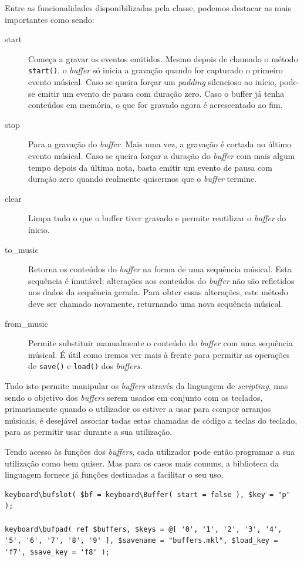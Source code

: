 Entre as funcionalidades disponibilizadas pela classe, podemos destacar as mais importantes como sendo:
\begin{description}
 \item[start] Começa a gravar os eventos emitidos. Mesmo depois de chamado o método \texttt{start()}, o \textit{buffer} só inicia a gravação quando for capturado o primeiro evento músical. Caso se queira forçar um \textit{padding} silencioso ao início, pode-se emitir um evento de pausa com duração zero. Caso o buffer já tenha conteúdos em memória, o que for gravado agora é acrescentado ao fim.
 \item[stop] Para a gravação do \textit{buffer}. Mais uma vez, a gravação é cortada no último evento músical. Caso se queira forçar a duração do \textit{buffer} com mais algum tempo depois da última nota, basta emitir um evento de pausa com duração zero quando realmente quisermos que o \textit{buffer} termine.
 \item[clear] Limpa tudo o que o buffer tiver gravado e permite reutilizar o \textit{buffer} do ínicio.
 \item[to\_music] Retorna os conteúdos do \textit{buffer} na forma de uma sequência músical. Esta sequência é ímutável: alterações aos conteúdos do \textit{buffer} não são refletidos nos dados da sequência gerada. Para obter essas alterações, este método deve ser chamado novamente, returnando uma nova sequência músical.
 \item[from\_music] Permite substituir manualmente o conteúdo do \textit{buffer} com uma sequência músical. É útil como iremos ver mais à frente para permitir as operações de \texttt{save()} e \texttt{load()} dos \textit{buffers}.
\end{description}

Tudo isto permite manipular os \textit{buffers} através da linguagem de \textit{scripting}, mas sendo o objetivo dos \textit{buffers} serem usados em conjunto com os teclados, primariamente quando o utilizador os estiver a usar para compor arranjos músicais, é desejável associar todas estas chamadas de código a teclas do teclado, para as permitir usar durante a sua utilização.

Tendo acesso às funções dos \textit{buffers}, cada utilizador pode então programar a sua utilização como bem quiser. Mas para os casos mais comuns, a biblioteca da linguagem fornece já funções destinadas a facilitar o seu uso.

\begin{lstlisting}[caption={Funções disponibilizadas para criação de \textit{buffers} controlados por teclados.}]
keyboard\bufslot( $bf = keyboard\Buffer( start = false ), $key = "p" );

keyboard\bufpad( ref $buffers, $keys = @[ '0', '1', '2', '3', '4', '5', '6', '7', '8', '9' ], $savename = "buffers.mkl", $load_key = 'f7', $save_key = 'f8' );
\end{lstlisting}

